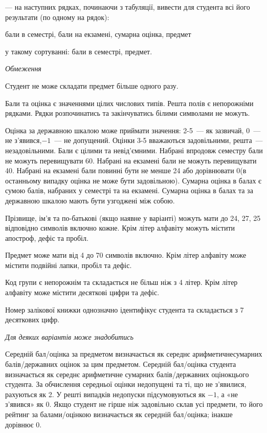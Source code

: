 \documentclass[11pt, ukrainian]{article}
\begin{document}
{\noindent}--- на наступних рядках, починаючи з табуляції, вивести для студента всі його результати (по одному на рядок):\par
бали в семестрі, бали на екзамені, сумарна оцінка, предмет

{\noindent}у такому сортуванні: бали в семестрі, предмет.


\bigskip\textit{Обмеження}

Студент не може складати предмет більше одного разу.

Бали та оцінка є значеннями цілих числових типів. Решта полів є непорожніми рядками.
Рядки розпочинатись та закінчуватись білими символами не можуть.

Оцінка за державною шкалою може приймати значення: 2-5~--- як зазвичай, 0~--- не з’явився,$-1$~--- не допущений. 
Оцінки 3-5 вважаються задовільними, решта~--- незадовільними. 
Бали є цілими та невід’ємними.
Набрані впродовж семестру бали не можуть перевищувати 60. 
Набрані на екзамені бали не можуть перевищувати 40. 
Набрані на екзамені бали повинні бути не менше 24 або дорівнювати 0(в останньому випадку оцінка не може бути задовільною). 
Сумарна оцінка в балах є сумою балів, набраних у семестрі та на екзамені.
Сумарна оцінка в балах та за державною шкалою мають бути узгоджені між собою.

Прізвище, ім’я та по-батькові (якщо наявне у варіанті) можуть мати до 24, 27, 25 відповідно символів включно кожне. 
Крім літер алфавіту можуть містити апостроф, дефіс та пробіл.

Предмет може мати від 4 до 70 символів включно. 
Крім літер алфавіту може містити подвійні лапки, пробіл та дефіс.

Код групи є непорожнім та складається не більш ніж з 4 літер. 
Крім літер алфавіту може містити десяткові цифри та дефіс.


Номер залікової книжки однозначно ідентифікує студента та складається з 7 десяткових цифр. 

\bigskip\textit{Для деяких варіантів може знадобитись}

Середній бал/оцінка за предметом визначається як середнє арифметичнесумарних балів/державних оцінок за цим предметом. 
Середній бал/оцінка студента визначається як середнє арифметичне сумарних балів/державних оцінокцього студента. 
За обчислення середньої оцінки недопущені та ті, що не з’явилися, рахуються як 2.
У решті випадків недопуски підсумовуються як $-1$, а «не з’явився» як 0.
Якщо студент не гірше ніж задовільно склав усі предмети, 
то його рейтинг за балами/оцінкою визначається як середній бал/оцінка; інакше дорівнює 0.
\end{document}
